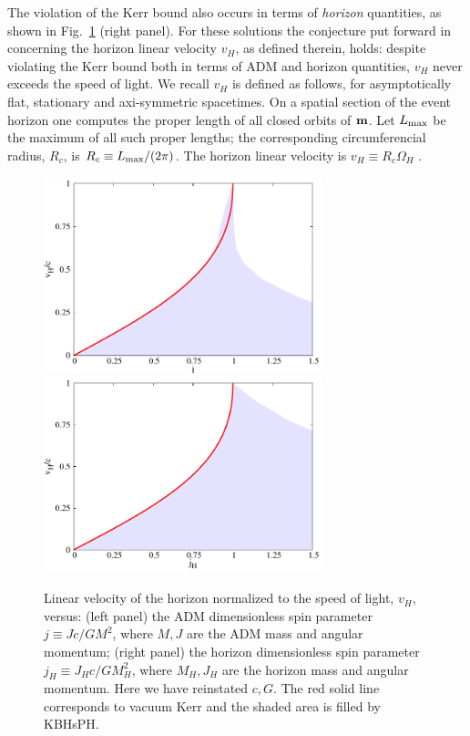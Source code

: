 The violation of the Kerr bound also occurs in terms of \textit{horizon} quantities, as shown in Fig.~\ref{vconjecture} (right panel). For these solutions the conjecture put forward in~\cite{Herdeiro:2015moa} concerning the horizon linear velocity $v_H$, as defined therein, holds: despite violating the Kerr bound both in terms of ADM and horizon quantities, $v_H$ never exceeds the speed of light.  We recall $v_H$ is defined as follows, for asymptotically flat, stationary and axi-symmetric spacetimes. On a spatial section of the event horizon one computes the proper length of all closed orbits of ${\bf m}$. Let $L_{\rm max}$ be the maximum of all such proper lengths; the corresponding circumferencial radius, $R_c$, is $R_c\equiv {L_{\rm max}}/({2\pi})$. 
The horizon linear velocity is $v_H \equiv R_c \Omega_H$ \cite{Herdeiro:2015moa}.
 





\begin{figure}[h!]
  \begin{center}
    \includegraphics[width=8.1cm]{papers/Proca/ProcaBH-j-v-bound.pdf}
      \includegraphics[width=8.1cm]{papers/Proca/ProcaBH-jKv-bound.pdf}
  \end{center}
 \caption{Linear velocity of the horizon normalized to the speed of light, $v_H$, versus:  (left panel)  the ADM dimensionless spin parameter $j\equiv Jc/GM^2$, where $M,J$ are the ADM mass and angular momentum; (right panel) the horizon dimensionless spin parameter $j_H\equiv J_Hc/GM_H^2$, where $M_H,J_H$ are the horizon mass and angular momentum. Here we have reinstated $c,G$. The red solid line corresponds to vacuum Kerr and the shaded area is filled by KBHsPH.}
  \label{vconjecture}
\end{figure}







